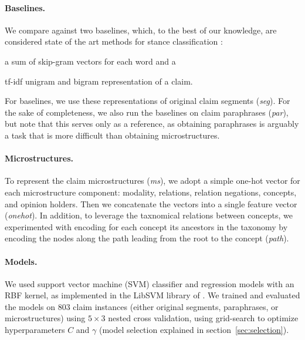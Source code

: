 \paragraph{Baselines.} 
We compare against two baselines, which, to the best of our knowledge, are
considered state of the art methods for stance classification
\citep{sobhani2016detecting}: 
\begin{enumerate*}[label=(\arabic*)]
\item a sum of skip-gram vectors \citep{mikolov2013distributed} for each word
and a
\item tf-idf unigram and bigram representation of a claim.
\end{enumerate*}
For baselines, we use these representations of original claim segments
(\emph{seg}). For the sake of completeness, we also run 
the baselines on claim paraphrases (\emph{par}), but note that this serves
only as a reference, as obtaining paraphrases is arguably a task 
that is more difficult than obtaining microstructures. 

\paragraph{Microstructures.}
To represent the claim microstructures (\emph{ms}), we adopt a simple 
one-hot vector for each microstructure component: modality, relations, 
relation negations, concepts, and opinion holders.
Then we concatenate the vectors into a single feature vector (\emph{onehot}). 
In addition, to leverage the taxnomical relations between concepts, 
we experimented with encoding for each concept its ancestors in the taxonomy
by encoding the nodes along the path leading from the root to the concept (\emph{path}).

\paragraph{Models. }
We used support vector machine (SVM) classifier and regression models with an
RBF kernel, as implemented in the LibSVM library of \citet{chang2011libsvm}.
We trained and evaluated the models on 803 claim instances
(either original segments, paraphrases, or microstructures) using
$5 \times 3$ nested cross validation, using grid-search to 
optimize hyperparameters $C$ and $\gamma$
(model selection explained in section~\ref{sec:selection}).

